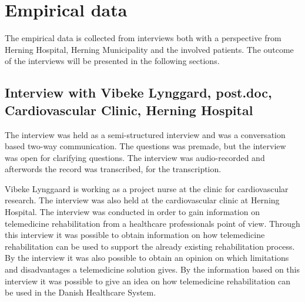 \chapter{Empirical data}
\label{empirical}

The empirical data is collected from interviews both with a perspective from Herning Hospital, Herning Municipality and the involved patients. The outcome of the interviews will be presented in the following sections. 

\section{Interview with Vibeke Lynggard, post.doc, Cardiovascular Clinic, Herning Hospital}
The interview was held as a semi-structured interview and was a conversation based two-way communication. The questions was premade, but the interview was open for clarifying questions. The interview was audio-recorded and afterwords the record was transcribed,  for the transcription.    

Vibeke Lynggaard is working as a project nurse at the clinic for cardiovascular research. The interview was also held at the cardiovascular clinic at Herning Hospital. The interview was conducted in order to gain information on telemedicine rehabilitation from a healthcare professionals point of view. Through this interview it was possible to obtain information on how telemedicine rehabilitation can be used to support the already existing rehabilitation process. By the interview it was also possible to obtain an opinion on which limitations and disadvantages a telemedicine solution gives. By the information based on this interview it was possible to give an idea on how telemedicine rehabilitation can be used in the Danish Healthcare System. 

